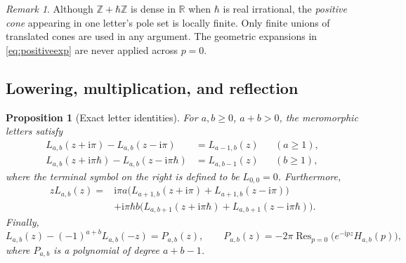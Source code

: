 \documentclass[11pt]{article}
\numberwithin{equation}{section}
\newtheorem{proposition}[proposition]{Proposition}
\theoremstyle{definition}
\theoremstyle{remark}
\newtheorem{remark}[remark]{Remark}
\newcommand{\Z}{\mathbb Z}
\newcommand{\R}{\mathbb R}
\newcommand{\ii}{\mathrm i}
\newcommand{\Res}{\operatorname{Res}}
\newcommand{\qh}{\hbar}
\begin{document}
\begin{remark}
Although $\Z+\qh\Z$ is dense in $\R$ when $\qh$ is real irrational, the
\emph{positive cone} appearing in one letter's pole set is locally finite.
Only finite unions of translated cones are used in any argument. The
geometric expansions in \eqref{eq:positiveexp} are never applied across
$p=0$.
\end{remark}

\subsection{Lowering, multiplication, and reflection}

\begin{proposition}[Exact letter identities]\label{prop:identities}
For $a,b\geq0$, $a+b>0$, the meromorphic letters satisfy
\begin{align}
 L_{a,b}(z+\ii\pi)-L_{a,b}(z-\ii\pi)&=L_{a-1,b}(z)
 &&(a\geq1),\label{eq:lowerX}\\
 L_{a,b}(z+\ii\pi\qh)-L_{a,b}(z-\ii\pi\qh)&=L_{a,b-1}(z)
 &&(b\geq1),\label{eq:lowerY}
\end{align}
where the terminal symbol on the right is defined to be $L_{0,0}=0$.
Furthermore,
\begin{equation}\label{eq:mult}
 \begin{split}
 zL_{a,b}(z)
 ={}&\ii\pi a\bigl(L_{a+1,b}(z+\ii\pi)+L_{a+1,b}(z-\ii\pi)\bigr)\\
 &+\ii\pi\qh b\bigl(L_{a,b+1}(z+\ii\pi\qh)
                    +L_{a,b+1}(z-\ii\pi\qh)\bigr).
 \end{split}
\end{equation}
Finally,
\begin{equation}\label{eq:reflection}
 L_{a,b}(z)-(-1)^{a+b}L_{a,b}(-z)=P_{a,b}(z),\qquad
 P_{a,b}(z)=-2\pi\Res_{p=0}\bigl(e^{-\ii pz}H_{a,b}(p)\bigr),
\end{equation}
where $P_{a,b}$ is a polynomial of degree $a+b-1$.
\end{proposition}
\end{document}
